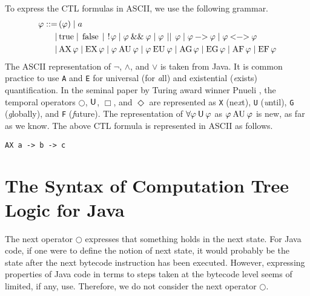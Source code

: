 \documentclass[12pt]{article}
\newcommand{\always}{\Box}
\newcommand{\eventually}{\Diamond}
\newcommand{\nxt}{\bigcirc}
\newcommand{\until}{\mathbin{\sf U}}
\newcommand{\TRUE}{\mbox{\lstinline{true}}}
\newcommand{\FALSE}{\mbox{\lstinline{false}}}
\newcommand{\NOT}{\mbox{\lstinline{!}}}
\newcommand{\AND}{\mathbin{\mbox{\lstinline{\&\&}}}}
\newcommand{\OR}{\mathbin{\mbox{\lstinline{||}}}}
\newcommand{\IMPLIES}{\mathbin{\mbox{\lstinline{->}}}}
\newcommand{\IFF}{\mathbin{\mbox{\lstinline{<->}}}}
\newcommand{\AX}{\mbox{\lstinline{AX}\,}}
\newcommand{\EX}{\mbox{\lstinline{EX}\,}}
\newcommand{\AG}{\mbox{\lstinline{AG}\,}}
\newcommand{\EG}{\mbox{\lstinline{EG}\,}}
\newcommand{\AF}{\mbox{\lstinline{AF}\,}}
\newcommand{\EF}{\mbox{\lstinline{EF}\,}}
\newcommand{\AU}{\mathbin{\mbox{\lstinline{AU}}}}
\newcommand{\EU}{\mathbin{\mbox{\lstinline{EU}}}}
\theoremstyle{definition}
\begin{document}
To express the CTL formulas in ASCII, we use the following grammar.
\begin{align*}
\varphi
::= \, & ( \varphi ) 
\mid a\\
\mid\, & \TRUE
\mid \FALSE
\mid \NOT \varphi
\mid \varphi \AND \varphi
\mid \varphi \OR \varphi
\mid \varphi \IMPLIES \varphi
\mid \varphi \IFF \varphi\\
\mid \, & \AX \varphi
\mid \EX \varphi
\mid  \varphi \AU \varphi
\mid \varphi \EU \varphi
\mid \AG \varphi
\mid \EG \varphi
\mid \AF \varphi
\mid \EF \varphi
\end{align*}
The ASCII representation of $\neg$, $\wedge$, and $\vee$ is taken from Java.  It is common practice to use \lstinline{A} and \lstinline{E} for universal (for \emph{a}ll) and existential (\emph{e}xists) quantification.  In the seminal paper by Turing award winner Pnueli \cite{P77}, the temporal operators $\nxt$, $\until$, $\always$, and $\eventually$ are represented as \lstinline{X} (ne\emph{x}t), \lstinline{U} (\emph{u}ntil), \lstinline{G} (\emph{g}lobally), and \lstinline{F} (\emph{f}uture).  The representation of $\forall \varphi \until \varphi$ as $\varphi \AU \varphi$ is new, as far as we know.  The above CTL formula is represented in ASCII as follows.
\begin{center}
\lstinline{AX a -> b -> c}
\end{center}

\section{The Syntax of Computation Tree Logic for Java}

The next operator $\nxt$ expresses that something holds in the next state.  For Java code, if one were to define the notion of next state, it would probably be the state after the next bytecode instruction has been executed.   However, expressing properties of Java code in terms to steps taken at the bytecode level seems of limited, if any, use.  Therefore, we do not consider the next operator $\nxt$.
\end{document}
